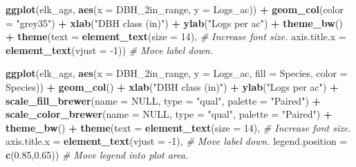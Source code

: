 \documentclass[
  11pt,
]{krantz}
\newenvironment{Shaded}{\begin{snugshade}}{\end{snugshade}}
\newcommand{\CommentTok}[1]{\textcolor[rgb]{0.56,0.35,0.01}{\textit{#1}}}
\newcommand{\DataTypeTok}[1]{\textcolor[rgb]{0.13,0.29,0.53}{#1}}
\newcommand{\DecValTok}[1]{\textcolor[rgb]{0.00,0.00,0.81}{#1}}
\newcommand{\FloatTok}[1]{\textcolor[rgb]{0.00,0.00,0.81}{#1}}
\newcommand{\KeywordTok}[1]{\textcolor[rgb]{0.13,0.29,0.53}{\textbf{#1}}}
\newcommand{\NormalTok}[1]{#1}
\newcommand{\OperatorTok}[1]{\textcolor[rgb]{0.81,0.36,0.00}{\textbf{#1}}}
\newcommand{\OtherTok}[1]{\textcolor[rgb]{0.56,0.35,0.01}{#1}}
\newcommand{\StringTok}[1]{\textcolor[rgb]{0.31,0.60,0.02}{#1}}
\theoremstyle{definition}
\theoremstyle{definition}
\theoremstyle{definition}
\theoremstyle{definition}
\theoremstyle{remark}
\begin{document}
\begin{Shaded}
\begin{Highlighting}[]
\KeywordTok{ggplot}\NormalTok{(elk\_ags, }\KeywordTok{aes}\NormalTok{(}\DataTypeTok{x =}\NormalTok{ DBH\_2in\_range, }\DataTypeTok{y =}\NormalTok{ Logs\_ac)) }\OperatorTok{+}
\StringTok{  }\KeywordTok{geom\_col}\NormalTok{(}\DataTypeTok{color =} \StringTok{"grey35"}\NormalTok{) }\OperatorTok{+}\StringTok{ }
\StringTok{  }\KeywordTok{xlab}\NormalTok{(}\StringTok{"DBH class (in)"}\NormalTok{) }\OperatorTok{+}\StringTok{ }
\StringTok{  }\KeywordTok{ylab}\NormalTok{(}\StringTok{"Logs per ac"}\NormalTok{) }\OperatorTok{+}
\StringTok{  }\KeywordTok{theme\_bw}\NormalTok{() }\OperatorTok{+}\StringTok{ }
\StringTok{  }\KeywordTok{theme}\NormalTok{(}\DataTypeTok{text =} \KeywordTok{element\_text}\NormalTok{(}\DataTypeTok{size =} \DecValTok{14}\NormalTok{), }\CommentTok{\# Increase font size.}
        \DataTypeTok{axis.title.x =} \KeywordTok{element\_text}\NormalTok{(}\DataTypeTok{vjust =} \DecValTok{{-}1}\NormalTok{)) }\CommentTok{\# Move label down.}

\KeywordTok{ggplot}\NormalTok{(elk\_ags, }\KeywordTok{aes}\NormalTok{(}\DataTypeTok{x =}\NormalTok{ DBH\_2in\_range, }\DataTypeTok{y =}\NormalTok{ Logs\_ac, }
                    \DataTypeTok{fill =}\NormalTok{ Species, }\DataTypeTok{color =}\NormalTok{ Species)) }\OperatorTok{+}
\StringTok{  }\KeywordTok{geom\_col}\NormalTok{() }\OperatorTok{+}\StringTok{ }
\StringTok{  }\KeywordTok{xlab}\NormalTok{(}\StringTok{"DBH class (in)"}\NormalTok{) }\OperatorTok{+}\StringTok{ }
\StringTok{  }\KeywordTok{ylab}\NormalTok{(}\StringTok{"Logs per ac"}\NormalTok{) }\OperatorTok{+}
\StringTok{  }\KeywordTok{scale\_fill\_brewer}\NormalTok{(}\DataTypeTok{name =} \OtherTok{NULL}\NormalTok{, }\DataTypeTok{type =} \StringTok{"qual"}\NormalTok{, }\DataTypeTok{palette =} \StringTok{"Paired"}\NormalTok{) }\OperatorTok{+}
\StringTok{  }\KeywordTok{scale\_color\_brewer}\NormalTok{(}\DataTypeTok{name =} \OtherTok{NULL}\NormalTok{, }\DataTypeTok{type =} \StringTok{"qual"}\NormalTok{, }\DataTypeTok{palette =} \StringTok{"Paired"}\NormalTok{) }\OperatorTok{+}
\StringTok{  }\KeywordTok{theme\_bw}\NormalTok{() }\OperatorTok{+}\StringTok{ }
\StringTok{  }\KeywordTok{theme}\NormalTok{(}\DataTypeTok{text =} \KeywordTok{element\_text}\NormalTok{(}\DataTypeTok{size =} \DecValTok{14}\NormalTok{), }\CommentTok{\# Increase font size.}
        \DataTypeTok{axis.title.x =} \KeywordTok{element\_text}\NormalTok{(}\DataTypeTok{vjust =} \DecValTok{{-}1}\NormalTok{), }\CommentTok{\# Move label down.}
        \DataTypeTok{legend.position =} \KeywordTok{c}\NormalTok{(}\FloatTok{0.85}\NormalTok{,}\FloatTok{0.65}\NormalTok{)) }\CommentTok{\# Move legend into plot area.}
\end{Highlighting}
\end{Shaded}
\end{document}
